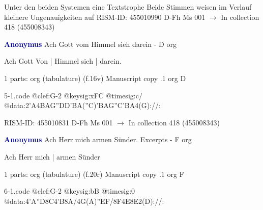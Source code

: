 \documentclass[twocolumn]{book}
\begin{document}
\newline Unter den beiden Systemen eine Textstrophe
\newline Beide Stimmen weisen im Verlauf kleinere Ungenauigkeiten auf
\newline RISM-ID: 455010990
\newline D-Fh  Ms 001
\newline $\rightarrow$ In collection 418 (455008343)
      
\newline \par \vspace{7pt} \textcolor{darkblue}{\textbf{Anonymus  }}
\newline Ach Gott vom Himmel sieh darein - D
\newline org
\newline \begin{itshape}[f.16v, at left:] Ach Gott Von | Himmel sieh | darein.\end{itshape} 
\newline \textcolor{darkblue}{}  1 parts: org (tabulature)  (f.16v)
\newline Manuscript copy
.1  org  D  
\begin{filecontents*}{5-1.code}
@clef:G-2
@keysig:xFC
@timesig:c/
@data:2'A4BAG''DD'BA(''C)'BAG''C'BA4(G)://:
\end{filecontents*}
\newline
%

\newline RISM-ID: 455010831
\newline D-Fh  Ms 001
\newline $\rightarrow$ In collection 418 (455008343)
      
\newline \par \vspace{7pt} \textcolor{darkblue}{\textbf{Anonymus  }}
\newline Ach Herr mich armen Sünder. Excerpts - F
\newline org
\newline \begin{itshape}[f.20r, at left:] Ach Herr mich | armen Sünder\end{itshape} 
\newline \textcolor{darkblue}{}  1 parts: org (tabulature)  (f.20r)
\newline Manuscript copy
.1  org  F  
\begin{filecontents*}{6-1.code}
@clef:G-2
@keysig:bB
@timesig:0
@data:4'A''D8C4'B8A/4G(A)''EF/8F4E8E2(D)://:
\end{filecontents*}
\newline
%
\end{document}
